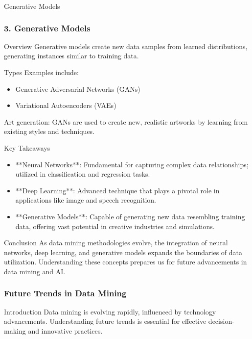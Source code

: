 \documentclass[aspectratio=169]{beamer}
\begin{document}
\begin{frame}[fragile]{Generative Models}
    \frametitle{3. Generative Models}
    
    \begin{block}{Overview}
        Generative models create new data samples from learned distributions, generating instances similar to training data.
    \end{block}
    
    \begin{block}{Types}
        Examples include:
        \begin{itemize}
            \item Generative Adversarial Networks (GANs)
            \item Variational Autoencoders (VAEs)
        \end{itemize}
    \end{block}
    
    \begin{example}
        Art generation: GANs are used to create new, realistic artworks by learning from existing styles and techniques.
    \end{example}
\end{frame}

\begin{frame}[fragile]{Key Takeaways}
    \begin{itemize}
        \item **Neural Networks**: Fundamental for capturing complex data relationships; utilized in classification and regression tasks.
        \item **Deep Learning**: Advanced technique that plays a pivotal role in applications like image and speech recognition.
        \item **Generative Models**: Capable of generating new data resembling training data, offering vast potential in creative industries and simulations.
    \end{itemize}
\end{frame}

\begin{frame}[fragile]{Conclusion}
    As data mining methodologies evolve, the integration of neural networks, deep learning, and generative models expands the boundaries of data utilization. Understanding these concepts prepares us for future advancements in data mining and AI.
\end{frame}

\begin{frame}[fragile]
    \frametitle{Future Trends in Data Mining}
    \begin{block}{Introduction}
        Data mining is evolving rapidly, influenced by technology advancements. Understanding future trends is essential for effective decision-making and innovative practices.
    \end{block}
\end{frame}
\end{document}
